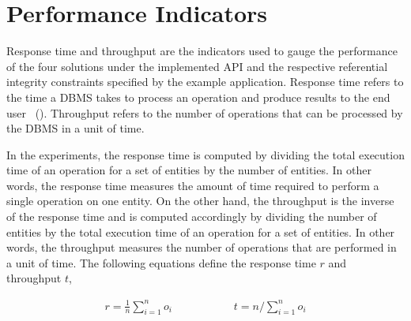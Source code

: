 \section{Performance Indicators} \label{sexp:PerformanceIndicators}

Response time and throughput are the indicators used to gauge the
performance of the four solutions under the implemented \ac{API} and the
respective referential integrity constraints specified by the example
application.  Response time refers to the time a \ac{DBMS}  takes to process an
operation and produce results to the end user~\citep{boral} ().  Throughput  refers to  the number of operations that can be
processed by the \ac{DBMS} in a unit of time. 

In the experiments,  the response time is computed by dividing the total
execution time of an operation for a set of entities by the number of entities.  In other
words,  the response time measures the amount of time required to perform a
single operation on one entity.  On the other hand,  the throughput is the
inverse of the response time and is computed accordingly by dividing the number of entities by
the total execution time of an operation for a set of entities.  In other words, 
the throughput measures the number of operations that are performed in a unit
of time.  The following equations define the response time $r$ and throughput
$t$,
 


\begin{equation*}
\begin{gathered}
\displaystyle r = \frac{1}{n}\sum_{i = 1}^{n}{o_i}
\end{gathered} \hspace{2cm}
\begin{gathered}
t = n / \sum_{i = 1}^{n}{o_i}  
\end{gathered}
\end{equation*}

% 	 

